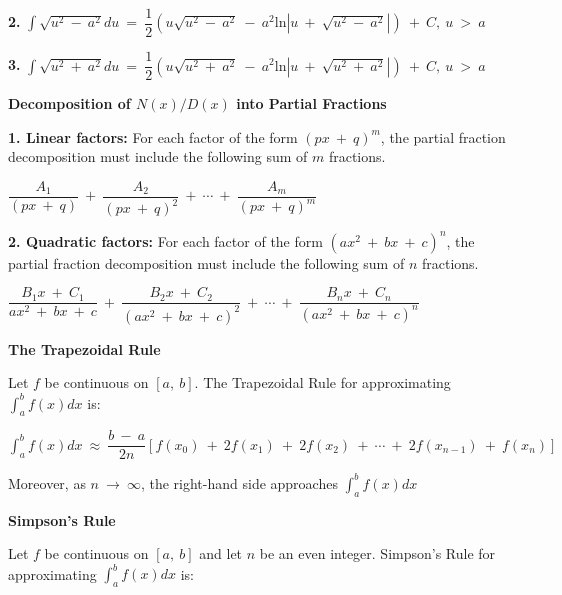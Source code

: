 \documentclass{article}
\begin{document}
\begin{large}
\hspace{0.1in} \textbf{2.} $\displaystyle\int\sqrt{u^{2}\ -\ a^{2}}du\ =\ \dfrac{1}{2}\left(u\sqrt{u^{2}\ -\ a^{2}}\ -\ a^{2}\text{ln}|u\ +\ \sqrt{u^{2}\ -\ a^{2}}|\right)\ +\ C,\ u\ >\ a$

\hspace{0.1in} \textbf{3.} $\displaystyle\int\sqrt{u^{2}\ +\ a^{2}}du\ =\ \dfrac{1}{2}\left(u\sqrt{u^{2}\ +\ a^{2}}\ -\ a^{2}\text{ln}|u\ +\ \sqrt{u^{2}\ +\ a^{2}}|\right)\ +\ C,\ u\ >\ a$

\vspace{0.4in}
\textbf{Decomposition of $N(x)/D(x)$ into Partial Fractions}

\hspace{0.1in} \textbf{1. Linear factors:} For each factor of the form $(px\ +\ q)^{m}$, the partial fraction decomposition must include the following sum of $m$ fractions.

\hspace{0.2in} $\dfrac{A_{1}}{(px\ +\ q)}\ +\ \dfrac{A_{2}}{(px\ +\ q)^{2}}\ +\ \cdots\ +\ \dfrac{A_{m}}{(px\ +\ q)^{m}}$

\hspace{0.1in} \textbf{2. Quadratic factors:} For each factor of the form $(ax^{2}\ +\ bx\ +\ c)^{n}$, the partial fraction decomposition must include the following sum of $n$ fractions.

\hspace{0.2in} $\dfrac{B_{1}x\ +\ C_{1}}{ax^{2}\ +\ bx\ +\ c}\ +\ \dfrac{B_{2}x\ +\ C_{2}}{(ax^{2}\ +\ bx\ +\ c)^{2}}\ +\ \cdots\ +\ \dfrac{B_{n}x\ +\ C_{n}}{(ax^{2}\ +\ bx\ +\ c)^{n}}$

\textbf{The Trapezoidal Rule}

\hspace{0.1in} Let $f$ be continuous on $[a,\ b]$.  The Trapezoidal Rule for approximating $\displaystyle\int^{b}_{a}f(x)dx$ is:

\hspace{0.2in} $\displaystyle\int^{b}_{a}f(x)dx\ \approx\ \dfrac{b\ -\ a}{2n}[f(x_{0})\ +\ 2f(x_{1})\ +\ 2f(x_{2})\ +\ \cdots\ +\ 2f(x_{n-1})\ +\ f(x_{n})]$

\hspace{0.1in} Moreover, as $n\ \rightarrow\ \infty$, the right-hand side approaches $\displaystyle\int^{b}_{a}f(x)dx$

\vspace{0.5in}
\textbf{Simpson's Rule}

\hspace{0.1in} Let $f$ be continuous on $[a,\ b]$ and let $n$ be an even integer.  Simpson's Rule for approximating $\displaystyle\int^{b}_{a}f(x)dx$ is:


\end{large}
\end{document}
